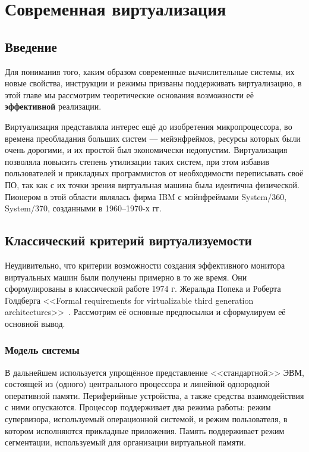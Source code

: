 \chapter{Современная виртуализация}\label{chapter14}


\section{Введение}

Для понимания того, каким образом современные вычислительные системы, их новые свойства, инструкции и режимы призваны поддерживать виртуализацию, в этой главе мы рассмотрим теоретические основания возможности её \textbf{эффективной} реализации. 

Виртуализация представляла интерес ещё до изобретения микропроцессора, во времена преобладания больших систем --- мейэнфреймов, ресурсы которых были очень дорогими, и их простой был экономически недопустим. Виртуализация позволяла повысить степень утилизации таких систем, при этом избавив пользователей и прикладных программистов от необходимости переписывать своё ПО, так как с их точки зрения виртуальная машина была идентична физической. Пионером в этой области являлась фирма IBM с мэйнфреймами System/360, System/370, созданными в 1960--1970-х гг.

\section{Классический критерий виртуализуемости}

Неудивительно, что критерии возможности создания эффективного монитора виртуальных машин были получены примерно в то же время. Они сформулированы в классической работе 1974 г. Жеральда Попека  и Роберта Голдберга <<Formal requirements for virtualizable third generation architectures>>~\cite{popek}. Рассмотрим её основные предпосылки и сформулируем её основной вывод.

\subsection{Модель системы}

В дальнейшем используется упрощённое представление <<стандартной>> ЭВМ, состоящей из (одного) центрального процессора и линейной однородной оперативной памяти. Периферийные устройства, а также средства взаимодействия с ними опускаются. Процессор поддерживает два режима работы: режим супервизора, используемый операционной системой, и режим пользователя, в котором исполняются прикладные приложения. Память поддерживает режим сегментации, используемый для организации виртуальной памяти.

